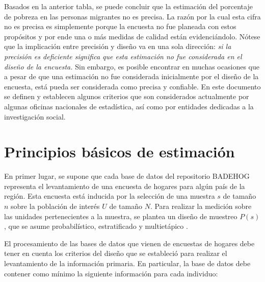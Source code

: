 \documentclass[12pt,spanish,]{book}
\begin{document}
Basados en la anterior tabla, se puede concluir que la estimación del porcentaje de pobreza en las personas migrantes no es precisa. La razón por la cual esta cifra no es precisa es simplemente porque la encuesta no fue planeada con estos propósitos y por ende una o más medidas de calidad están evidenciándolo. Nótese que la implicación entre precisión y diseño va en una sola dirección: \emph{si la precisión es deficiente significa que esta estimación no fue considerada en el diseño de la encuesta.} Sin embargo, es posible encontrar en muchas ocasiones que a pesar de que una estimación no fue considerada inicialmente por el diseño de la encuesta, está pueda ser considerada como precisa y confiable. En este documento se definen y establecen algunos criterios que son considerados actualmente por algunas oficinas nacionales de estadística, así como por entidades dedicadas a la investigación social.

\hypertarget{principios-basicos-de-estimacion}{%
\section{Principios básicos de estimación}\label{principios-basicos-de-estimacion}}

En primer lugar, se supone que cada base de datos del repositorio BADEHOG representa el levantamiento de una encuesta de hogares para algún país de la región. Esta encuesta está inducida por la selección de una muestra \(s\) de tamaño \(n\) sobre la población de interés \(U\) de tamaño \(N\). Para realizar la medición sobre las unidades pertenecientes a la muestra, se plantea un diseño de muestreo \(P(s)\), que se asume probabilístico, estratificado y multietápico \autocite{Gutierrez_2016}.

El procesamiento de las bases de datos que vienen de encuestas de hogares debe tener en cuenta los criterios del diseño que se estableció para realizar el levantamiento de la información primaria. En particular, la base de datos debe contener como mínimo la siguiente información para cada individuo:
\end{document}
